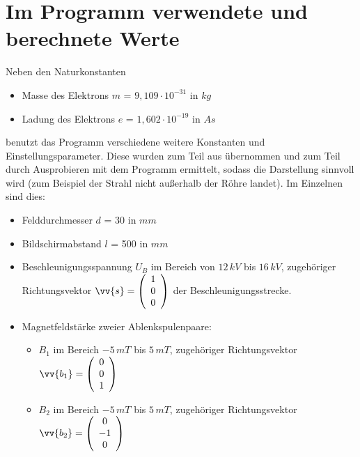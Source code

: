 \section{Im Programm verwendete und berechnete Werte}
Neben den Naturkonstanten
\begin{itemize}
    \item Masse des Elektrons $m$ =  $9,109 \cdot 10^{-31}$ in $kg$
    \item Ladung des Elektrons $e$ = $1,602 \cdot 10^{-19}$ in $As$
\end{itemize} 
benutzt das Programm verschiedene weitere Konstanten und Einstellungsparameter. 
Diese wurden zum Teil aus \cite{Gente1950} übernommen und zum Teil durch Ausprobieren mit dem Programm ermittelt, sodass die Darstellung sinnvoll wird (zum Beispiel der Strahl nicht außerhalb der Röhre landet).
Im Einzelnen sind dies:
\begin{itemize}
    \item Felddurchmesser $d$ = 30 in $mm$
    \item Bildschirmabstand $l$ = 500 in $mm$
    \item Beschleunigungsspannung $U_B$ im Bereich von $12 \, kV$ bis $16 \, kV$, zugehöriger Richtungsvektor $\vv{s} = \vektor{1}{0}{0}$ der Beschleunigungsstrecke.
    \item Magnetfeldstärke zweier Ablenkspulenpaare:
    \begin{itemize}
        \item $B_1$ im Bereich $-5 \, mT$ bis $5 \, mT$, zugehöriger Richtungsvektor $\vv{b_1} = \vektor{0}{0}{1}$ %
        \item $B_2$ im Bereich $-5 \, mT$ bis $5 \, mT$, zugehöriger Richtungsvektor $\vv{b_2} = \vektor{0}{-1}{0}$ %
    \end{itemize}
\end{itemize}

